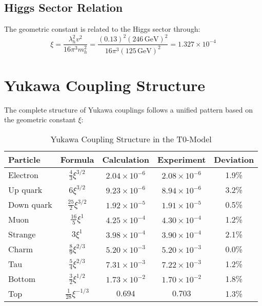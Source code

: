 \documentclass[12pt,a4paper]{article}
\newcommand{\xigeom}{\xi}
\begin{document}
	\subsection{Higgs Sector Relation}
	
	The geometric constant is related to the Higgs sector through:
	\begin{equation}
		\xigeom = \frac{\lambda_h^2 v^2}{16\pi^3 m_h^2} = \frac{(0.13)^2 (246\,\text{GeV})^2}{16\pi^3 (125\,\text{GeV})^2} = 1.327 \times 10^{-4}
	\end{equation}
	
	\section{Yukawa Coupling Structure}
	
	The complete structure of Yukawa couplings follows a unified pattern based on the geometric constant $\xigeom$:
	
	\begin{table}[H]
		\centering
		\caption{Yukawa Coupling Structure in the T0-Model}
		\begin{tabular}{@{}lcccc@{}}
			\toprule
			\textbf{Particle} & \textbf{Formula} & \textbf{Calculation} & \textbf{Experiment} & \textbf{Deviation} \\
			\midrule
			Electron & $\frac{4}{3}\xigeom^{3/2}$ & $2.04 \times 10^{-6}$ & $2.08 \times 10^{-6}$ & 1.9\% \\
			Up quark & $6\xigeom^{3/2}$ & $9.23 \times 10^{-6}$ & $8.94 \times 10^{-6}$ & 3.2\% \\
			Down quark & $\frac{25}{2}\xigeom^{3/2}$ & $1.92 \times 10^{-5}$ & $1.91 \times 10^{-5}$ & 0.5\% \\
			Muon & $\frac{16}{5}\xigeom^1$ & $4.25 \times 10^{-4}$ & $4.30 \times 10^{-4}$ & 1.2\% \\
			Strange & $3\xigeom^1$ & $3.98 \times 10^{-4}$ & $3.90 \times 10^{-4}$ & 2.1\% \\
			Charm & $\frac{8}{9}\xigeom^{2/3}$ & $5.20 \times 10^{-3}$ & $5.20 \times 10^{-3}$ & 0.0\% \\
			Tau & $\frac{5}{4}\xigeom^{2/3}$ & $7.31 \times 10^{-3}$ & $7.22 \times 10^{-3}$ & 1.2\% \\
			Bottom & $\frac{3}{2}\xigeom^{1/2}$ & $1.73 \times 10^{-2}$ & $1.70 \times 10^{-2}$ & 1.8\% \\
			Top & $\frac{1}{28}\xigeom^{-1/3}$ & $0.694$ & $0.703$ & 1.3\% \\
			\bottomrule
		\end{tabular}
	\end{table}
	
\end{document}
